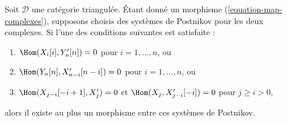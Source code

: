 \begin{lemma}
\label{lemma-uniqueness-maps-postnikov-systems}
Soit $\mathcal{D}$ une catégorie triangulée. Étant donné un morphisme
(\ref{equation-map-complexes}), supposons choisis des systèmes de Postnikov
pour les deux complexes. Si l'une des conditions suivantes est satisfaite :
\begin{enumerate}
\item $\Hom(X_i[i], Y'_n[n]) = 0$ pour $i = 1, \ldots, n$, ou
\item $\Hom(Y_n[n], X'_{n - i}[n - i]) = 0$ pour $i = 1, \ldots, n$, ou
\item $\Hom(X_{j - i}[-i + 1], X'_j) = 0$ et
$\Hom(X_j, X'_{j - i}[-i]) = 0$ pour $j \geq i > 0$,
\end{enumerate}
alors il existe au plus un morphisme entre ces systèmes de Postnikov.
\end{lemma}


